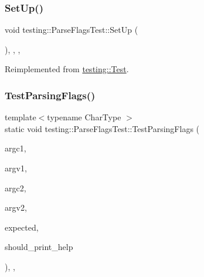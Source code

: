 \subsubsection{\texorpdfstring{SetUp()}{SetUp()}\hspace{0.1cm}{\footnotesize\ttfamily [3/3]}}
{\footnotesize\ttfamily void testing\+::\+Parse\+Flags\+Test\+::\+Set\+Up (\begin{DoxyParamCaption}{ }\end{DoxyParamCaption})\hspace{0.3cm}{\ttfamily [inline]}, {\ttfamily [override]}, {\ttfamily [protected]}, {\ttfamily [virtual]}}



Reimplemented from \mbox{\hyperlink{classtesting_1_1_test_a190315150c303ddf801313fd1a777733}{testing\+::\+Test}}.

\mbox{\label{classtesting_1_1_parse_flags_test_ad769e5f5a71939c3a9ad853b415fa9d2}} 
\subsubsection{\texorpdfstring{TestParsingFlags()}{TestParsingFlags()}\hspace{0.1cm}{\footnotesize\ttfamily [1/3]}}
{\footnotesize\ttfamily template$<$typename Char\+Type $>$ \\
static void testing\+::\+Parse\+Flags\+Test\+::\+Test\+Parsing\+Flags (\begin{DoxyParamCaption}\item[{int}]{argc1,  }\item[{const Char\+Type $\ast$$\ast$}]{argv1,  }\item[{int}]{argc2,  }\item[{const Char\+Type $\ast$$\ast$}]{argv2,  }\item[{const \mbox{\hyperlink{structtesting_1_1_flags}{Flags}} \&}]{expected,  }\item[{bool}]{should\+\_\+print\+\_\+help }\end{DoxyParamCaption})\hspace{0.3cm}{\ttfamily [inline]}, {\ttfamily [static]}, {\ttfamily [protected]}}

\mbox{\label{classtesting_1_1_parse_flags_test_ad769e5f5a71939c3a9ad853b415fa9d2}} 
